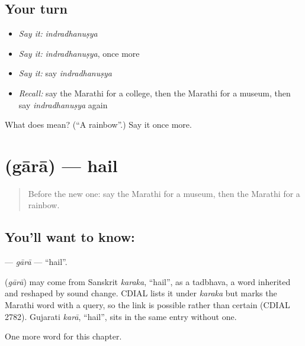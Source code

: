 \subsection*{Your turn}
\begin{itemize}
\raggedright
  \item \emph{Say it:} \emph{indradhanuṣya}
  \item \emph{Say it:} \emph{indradhanuṣya}, once more
  \item \emph{Say it:} say \emph{indradhanuṣya}
  \item \emph{Recall:} say the Marathi for a college, then the Marathi for a museum, then say \emph{indradhanuṣya} again
\end{itemize}

\begin{tcolorbox}[breakable,colback=teal!4,colframe=teal!35!black,title={Before you move on}]
What does  mean? (\textquotedblleft{}A rainbow\textquotedblright{}.) Say it once more.
\end{tcolorbox}
\section[\texorpdfstring{\mr{गारा} (gārā)}{गारा (gārā)}]{ (gārā) — hail}

\label{lesson:MR-C246-gara}



\begin{quote}
Before the new one: say the Marathi for a museum, then the Marathi for a rainbow.
\end{quote}

\subsection*{You'll want to know: }
\textbf{} — \emph{gārā} — \textquotedblleft{}hail\textquotedblright{}.

\begin{cousinweb}
\textbf{} (\emph{gārā}) may come from Sanskrit \emph{karaka}, \textquotedblleft{}hail\textquotedblright{}, as a tadbhava, a word inherited and reshaped by sound change. CDIAL lists it under \emph{karaka} but marks the Marathi word with a query, so the link is possible rather than certain (CDIAL 2782). Gujarati \emph{karā}, \textquotedblleft{}hail\textquotedblright{}, sits in the same entry without one.
\end{cousinweb}

\begin{grammarlens}[title={What you've built}]
One more word for this chapter.
\end{grammarlens}

